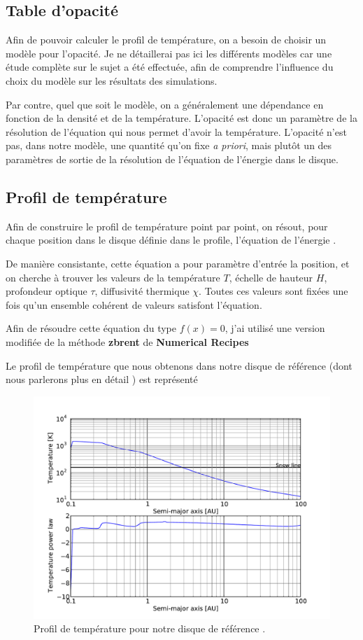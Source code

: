 \subsection{Table d'opacité}
Afin de pouvoir calculer le profil de température, on a besoin de choisir un modèle pour l'opacité. Je ne détaillerai pas ici les différents modèles car une étude complète sur le sujet a été effectuée, afin de comprendre l'influence du choix du modèle sur les résultats des simulations. 

Par contre, quel que soit le modèle, on a généralement une dépendance en fonction de la densité et de la température. L'opacité est donc un paramètre de la résolution de l'équation qui nous permet d'avoir la température. L'opacité n'est pas, dans notre modèle, une quantité qu'on fixe \textit{a priori}, mais plutôt un des paramètres de sortie de la résolution de l'équation de l'énergie dans le disque.

\subsection{Profil de température}
Afin de construire le profil de température point par point, on résout, pour chaque position dans le disque définie dans le profile, l'équation de l'énergie . 

De manière consistante, cette équation a pour paramètre d'entrée la position, et on cherche à trouver les valeurs de la température $T$, échelle de hauteur $H$, profondeur optique $\tau$, diffusivité thermique $\chi$. Toutes ces valeurs sont fixées une fois qu'un ensemble cohérent de valeurs satisfont l'équation.

Afin de résoudre cette équation du type $f(x)=0$, j'ai utilisé une version modifiée de la méthode \textbf{zbrent} de \textbf{Numerical Recipes} \citep{press1992numerical}

Le profil de température que nous obtenons dans notre disque de référence (dont nous parlerons plus en détail ) est représenté 

\begin{figure}[htb]
\centering
\includegraphics[width=0.75\linewidth]{figure/fiducial_temperature_profile.pdf}
\caption{Profil de température pour notre disque de référence \protect{}.}\label{fig:fiducial_temperature}
\end{figure}

